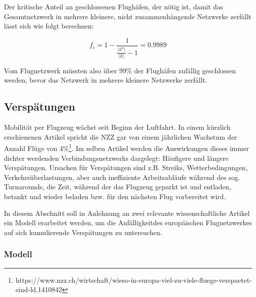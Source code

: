 Der kritische Anteil an geschlossenen Flughäfen, der nötig ist, damit das Gesamtnetzwerk in mehrere kleinere, nicht zusammenhängende Netzwerke zerfällt lässt sich wie folgt berechnen:

$$ f_c = 1 - \frac{1}{\frac{\langle k^{2}\rangle}{\langle k\rangle} - 1} = 0.9989 $$

Vom Flugnetzwerk müssten also über 99\% der Flughäfen zufällig geschlossen werden, bevor das Netzwerk in mehrere kleinere Netzwerke zerfällt.


\subsection{Verspätungen}
Mobilität per Flugzeug wächst seit Beginn der Luftfahrt.
In einem kürzlich erschienenen Artikel spricht die NZZ gar von einem jährlichen Wachstum der Anzahl Flüge von 4\%\footnote{https://www.nzz.ch/wirtschaft/wieso-in-europa-viel-zu-viele-fluege-verspaetet-sind-ld.1410842}.
Im selben Artikel werden die Auswirkungen dieses immer dichter werdenden Verbindungsnetzwerks dargelegt: Häufigere und längere Verspätungen.
Ursachen für Verspätungen sind z.B. Streiks, Wetterbedingungen, Verkehrsüberlastungen, aber auch ineffiziente Arbeitsabläufe während des sog. \guillemotleft Turnarounds\guillemotright,
die Zeit, während der das Flugzeug geparkt ist und entladen, betankt und wieder beladen bzw. für den nächsten Flug vorbereitet wird.

In diesem Abschnitt soll in Anlehnung an zwei relevante wissenschaftliche Artikel ein Modell erarbeitet werden,
um die \guillemotleft Anfälligkeit\guillemotright des europäischen Flugnetzwerkes auf sich kumulierende Verspätungen zu untersuchen.

\subsubsection{Modell}
\label{subsubsec:model}

